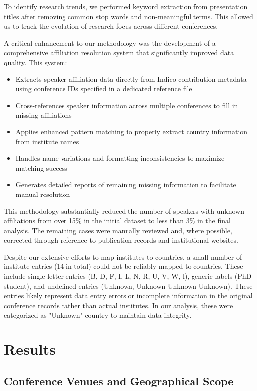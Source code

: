 \documentclass[a4paper,11pt]{article}
\begin{document}
To identify research trends, we performed keyword extraction from presentation titles after removing common stop words and non-meaningful terms. This allowed us to track the evolution of research focus across different conferences.

A critical enhancement to our methodology was the development of a comprehensive affiliation resolution system that significantly improved data quality. This system:
\begin{itemize}
    \item Extracts speaker affiliation data directly from Indico contribution metadata using conference IDs specified in a dedicated reference file
    \item Cross-references speaker information across multiple conferences to fill in missing affiliations
    \item Applies enhanced pattern matching to properly extract country information from institute names
    \item Handles name variations and formatting inconsistencies to maximize matching success
    \item Generates detailed reports of remaining missing information to facilitate manual resolution
\end{itemize}

This methodology substantially reduced the number of speakers with unknown affiliations from over 15\% in the initial dataset to less than 3\% in the final analysis. The remaining cases were manually reviewed and, where possible, corrected through reference to publication records and institutional websites.

Despite our extensive efforts to map institutes to countries, a small number of institute entries (14 in total) could not be reliably mapped to countries. These include single-letter entries (B, D, F, I, L, N, R, U, V, W, l), generic labels (PhD student), and undefined entries (Unknown, Unknown-Unknown-Unknown). These entries likely represent data entry errors or incomplete information in the original conference records rather than actual institutes. In our analysis, these were categorized as "Unknown" country to maintain data integrity.

\section{Results}

\subsection{Conference Venues and Geographical Scope}
\end{document}
